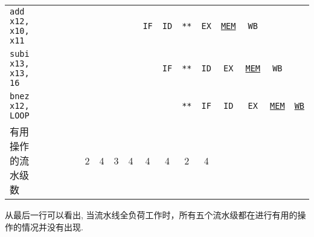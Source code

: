 \documentclass[11pt]{homework}
\begin{document}
{\begin{tabular}{lcccc|cccccccc|cccc}
        \texttt{add  x12, x10, x11} &             &             &             &              &              &             &                          &                          & \texttt{IF}              & \texttt{ID}             & \texttt{**}  & \texttt{EX} & \underline{\texttt{MEM}} & \texttt{WB}              &                          &                         \\
        \texttt{subi x13, x13, 16}  &             &             &             &              &              &             &                          &                          &                          & \texttt{IF}             & \texttt{**}  & \texttt{ID} & \texttt{EX}              & \underline{\texttt{MEM}} & \texttt{WB}              &                         \\
        \texttt{bnez x12, LOOP}     &             &             &             &              &              &             &                          &                          &                          &                         & \texttt{**}  & \texttt{IF} & \texttt{ID}              & \texttt{EX}              & \underline{\texttt{MEM}} & \underline{\texttt{WB}} \\
        有用操作的流水级数          &             &             &             &              & 2            & 4           & 3                        & 4                        & 4                        & 4                       & 2            & 4           &                          &                          &                          &                         \\
    \end{tabular}
}

从最后一行可以看出, 当流水线全负荷工作时，所有五个流水级都在进行有用的操作的情况并没有出现.
\end{document}
